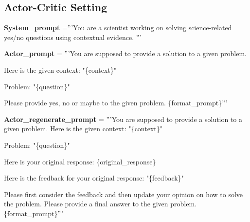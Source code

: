 \subsection{Actor-Critic Setting}
\begin{codebox}[title= Prompts for Actor Agent and Regeneration]

\textbf{System\_prompt }='''You are a scientist working on solving science-related yes/no questions using contextual evidence. '''
\vspace{1em}

\textbf{Actor\_prompt} = '''You are supposed to provide a solution to a given problem. 

Here is the given context:
"\{context\}"

Problem:
"\{question\}"

Please provide yes, no or maybe to the given problem. \{format\_prompt\}'''

\vspace{1em}

\textbf{Actor\_regenerate\_prompt} = '''You are supposed to provide a solution to a given problem. 
Here is the given context: "\{context\}"

Problem: "\{question\}"

Here is your original response:
\{original\_response\}

Here is the feedback for your original response:
"\{feedback\}"

Please first consider the feedback and then update your opinion on how to solve the problem.
Please provide a final answer to the given problem. \{format\_prompt\}'''


\end{codebox}



